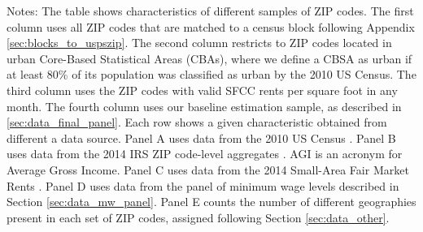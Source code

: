 \begin{landscape}
\begin{table}[hbt!]
    \begin{minipage}{.95\linewidth} \footnotesize
        \vspace{2mm}
        Notes: The table shows characteristics of different samples of ZIP codes.
        The first column uses all ZIP codes that are matched to a census block
        following Appendix \ref{sec:blocks_to_uspszip}.
        The second column restricts to ZIP codes located in urban Core-Based
        Statistical Areas (CBAs), where we define a CBSA as urban if at least
        80\% of its population was classified as urban by the 2010 US Census.
        The third column uses the ZIP codes with valid SFCC rents per square 
        foot in any month.
        The fourth column uses our baseline estimation sample, as described in 
        \ref{sec:data_final_panel}.
        Each row shows a given characteristic obtained from different a data 
        source.
        Panel A uses data from the 2010 US Census \parencite{CensusDecennial}.
        Panel B uses data from the 2014 IRS ZIP code-level aggregates
        \parencite{IRS}. AGI is an acronym for Average Gross Income.
        Panel C uses data from the 2014 Small-Area Fair Market 
        Rents \parencite[SAFMR;][]{hudSAFMR}.
        Panel D uses data from the panel of minimum wage levels 
        described in Section \ref{sec:data_mw_panel}.
        Panel E counts the number of different geographies present in each set
        of ZIP codes, assigned following Section \ref{sec:data_other}.
    \end{minipage}
\end{table}
\end{landscape}
